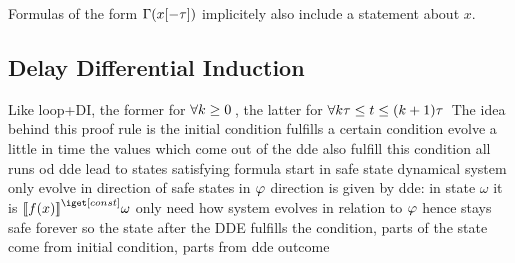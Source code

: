 \documentclass[10pt]{report}
\begin{document}
        Formulas of the form $\Gamma(x[-\tau])$ implicitely also include a statement about $x$.

    \subsection{Delay Differential Induction}
        \label{sec:delay-differential-induction}

        Like loop+DI, the former for $\lforall{k\geq 0}$, the latter for $\lforall{k\tau\leq t \leq (k+1)\tau}$
        The idea behind this proof rule is
        the initial condition fulfills a certain condition
        evolve a little in time
        the values which come out of the dde also fulfill this condition
        all runs od dde lead to states satisfying formula
        start in safe state
        dynamical system only evolve in direction of safe states in $\varphi$
        direction is given by dde: in state $\omega$ it is $\imodel{}{f(x)}\omega$
        only need how system evolves in relation to $\varphi$
        hence stays safe forever
        so the state after the DDE fulfills the condition, parts of the state come from initial condition, parts from dde outcome

        \begin{calculus}
        \end{calculus}
\end{document}
